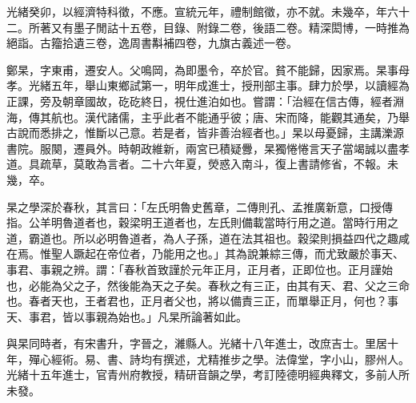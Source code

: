 \begin{pinyinscope}
光緒癸卯，以經濟特科徵，不應。宣統元年，禮制館徵，亦不就。未幾卒，年六十二。所著又有墨子閒詁十五卷，目錄、附錄二卷，後語二卷。精深閎博，一時推為絕詣。古籀拾遺三卷，逸周書斠補四卷，九旗古義述一卷。

鄭杲，字東甫，遷安人。父鳴岡，為即墨令，卒於官。貧不能歸，因家焉。杲事母孝。光緒五年，舉山東鄉試第一，明年成進士，授刑部主事。肆力於學，以讀經為正課，旁及朝章國故，矻矻終日，視仕進泊如也。嘗謂：「治經在信古傳，經者淵海，傳其航也。漢代諸儒，主乎此者不能通乎彼；唐、宋而降，能觀其通矣，乃舉古說而悉排之，惟斷以己意。若是者，皆非善治經者也。」杲以母憂歸，主講濼源書院。服闋，遷員外。時朝政維新，兩宮已積疑釁，杲獨惓惓言天子當竭誠以盡孝道。具疏草，莫敢為言者。二十六年夏，熒惑入南斗，復上書請修省，不報。未幾，卒。

杲之學深於春秋，其言曰：「左氏明魯史舊章，二傳則孔、孟推廣新意，口授傳指。公羊明魯道者也，穀梁明王道者也，左氏則備載當時行用之道。當時行用之道，霸道也。所以必明魯道者，為人子孫，道在法其祖也。穀梁則損益四代之趣咸在焉。惟聖人蹶起在帝位者，乃能用之也。」其為說兼綜三傳，而尤致嚴於事天、事君、事親之辨。謂：「春秋首致謹於元年正月，正月者，正即位也。正月謹始也，必能為父之子，然後能為天之子矣。春秋之有三正，由其有天、君、父之三命也。春者天也，王者君也，正月者父也，將以備責三正，而單舉正月，何也？事天、事君，皆以事親為始也。」凡杲所論著如此。

與杲同時者，有宋書升，字晉之，濰縣人。光緒十八年進士，改庶吉士。里居十年，殫心經術。易、書、詩均有撰述，尤精推步之學。法偉堂，字小山，膠州人。光緒十五年進士，官青州府教授，精研音韻之學，考訂陸德明經典釋文，多前人所未發。


\end{pinyinscope}